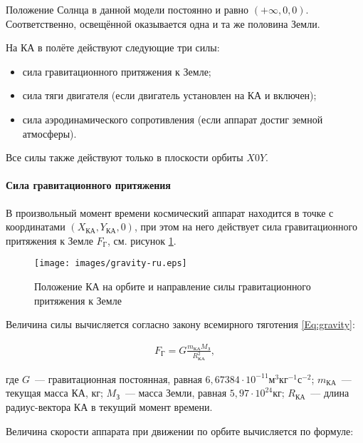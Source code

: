 \documentclass[12pt,a4paper]{article}
\begin{document}
Положение Солнца в данной модели постоянно и равно $(+\infty, 0, 0)$. Соответственно, освещённой
оказывается одна и та же половина Земли.

На КА в полёте действуют следующие три силы:

\begin{itemize}
\item сила гравитационного притяжения к Земле;
\item сила тяги двигателя (если двигатель установлен на КА и включен);
\item сила аэродинамического сопротивления (если аппарат достиг земной атмосферы).
\end{itemize}

Все силы также действуют только в плоскости орбиты $X0Y$.

\paragraph{Сила гравитационного притяжения}

В произвольный момент времени космический аппарат находится в точке с координатами $(X_{\text{КА}},
Y_{\text{КА}}, 0)$, при этом на него действует сила гравитационного притяжения к Земле $F_{\text{Г}}$,
см. рисунок \ref{Pic:Gravity}.

\begin{figure}[tbh]
  \begin{center}
    \texttt{[image: images/gravity-ru.eps]}
    \caption{Положение КА на орбите и направление силы гравитационного притяжения к Земле}
    \label{Pic:Gravity}
  \end{center}
\end{figure}

Величина силы вычисляется согласно закону всемирного тяготения \ref{Eq:gravity}:

\begin{eqnarray}
  F_{\text{Г}} = G \frac{m_{\text{КА}} M_{\text{З}}}{R_{\text{КА}}^2}, \label{Eq:gravity}
\end{eqnarray}

где $G$~--- гравитационная постоянная, равная $6,67384 \cdot 10^{-11} \text{м}^3
\text{кг}^{-1} \text{с}^{-2}$; $m_{\text{КА}}$~--- текущая масса КА, кг; $M_{\text{З}}$~--–
масса Земли, равная $5,97 \cdot 10^{24} \text{кг}$; $R_{\text{КА}}$~--– длина радиус-вектора
КА в текущий момент времени.

Величина скорости аппарата при движении по орбите вычисляется по формуле:
\end{document}
